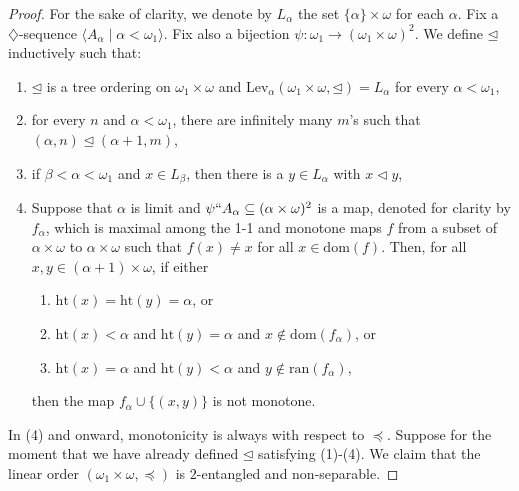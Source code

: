 \documentclass[12pt]{amsart}
\theoremstyle{definition}
\theoremstyle{remark}
\begin{document}
\begin{proof}
For the sake of clarity, we denote by $L_\alpha$ the set  $\{\alpha\}\times \omega$ for each $\alpha$. Fix a $\diamondsuit$-sequence $\langle A_\alpha \mid \alpha < \omega_1\rangle$. Fix also a bijection $\psi: \omega_1 \rightarrow (\omega_1 \times \omega)^2$.  We define $\unlhd$ inductively such that:\vspace{0.3em}
\begin{enumerate}
\itemsep0.3em
\item $\unlhd$ is a tree ordering on $\omega_1 \times \omega$ and $\mathrm{Lev}_\alpha(\omega_1 \times \omega, \unlhd) = L_\alpha$ for every $\alpha < \omega_1$,
\item for every $n$ and $\alpha < \omega_1$, there are infinitely many $m$'s such that $(\alpha, n) \unlhd (\alpha+1, m)$,
\item if $\beta < \alpha < \omega_1$ and $x \in L_\beta$, then there is a $y \in L_\alpha$ with $x \lhd y$,
\item Suppose that $\alpha$ is limit and $\psi``A_\alpha \subseteq (\alpha\times \omega)^2$ is a map, denoted for clarity by $f_\alpha$, which is maximal among the 1-1 and monotone maps $f$ from a subset of $\alpha \times \omega$ to $\alpha \times \omega$ such that $f(x) \neq x$ for all $x \in \mathrm{dom}(f)$. Then, for all $x,y \in (\alpha+1) \times \omega$, if either

\smallskip
\begin{enumerate}[label=(4\alph*)]
\item $\mathrm{ht}(x) = \mathrm{ht}(y) = \alpha$, or
\item $\mathrm{ht}(x) < \alpha$ and $\mathrm{ht}(y) = \alpha$ and $x \not\in \mathrm{dom}(f_\alpha)$, or
\item $\mathrm{ht}(x) = \alpha$ and $\mathrm{ht}(y) < \alpha$ and $y \not\in \mathrm{ran}(f_\alpha)$,
\end{enumerate}

\smallskip
\noindent then the map $f_\alpha \cup \{(x,y)\}$ is not monotone.\vspace{0.3em}
\end{enumerate}

In (4) and onward, monotonicity is always with respect to $\preceq$.
Suppose for the moment that we have already defined $\unlhd$ satisfying (1)-(4). We claim that the linear order $(\omega_1 \times \omega, \preceq)$ is $2$-entangled and non-separable.


\end{proof}
\end{document}
